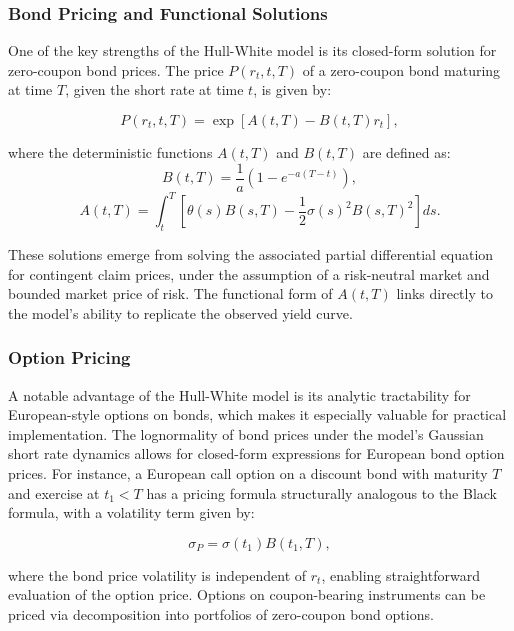 \subsubsection{Bond Pricing and Functional Solutions}
One of the key strengths of the Hull-White model is its closed-form solution for zero-coupon bond prices. The price \( P(r_t, t, T) \) of a zero-coupon bond maturing at time \( T \), given the short rate at time \( t \), is given by:

\begin{equation}
	P(r_t, t, T) = \exp\left[ A(t, T) - B(t, T) r_t \right],
\end{equation}

where the deterministic functions \( A(t, T) \) and \( B(t, T) \) are defined as:
\begin{equation}
	B(t, T) = \frac{1}{a} \left(1 - e^{-a(T - t)}\right),
\end{equation}
\begin{equation}
	A(t, T) = \int_t^T \left[ \theta(s) B(s, T) - \frac{1}{2} \sigma(s)^2 B(s, T)^2 \right] ds.
\end{equation}

These solutions emerge from solving the associated partial differential equation for contingent claim prices, under the assumption of a risk-neutral market and bounded market price of risk. The functional form of \( A(t, T) \) links directly to the model's ability to replicate the observed yield curve.

\subsubsection{Option Pricing}
A notable advantage of the Hull-White model is its analytic tractability for European-style options on bonds, which makes it especially valuable for practical implementation. The lognormality of bond prices under the model’s Gaussian short rate dynamics allows for closed-form expressions for European bond option prices. For instance, a European call option on a discount bond with maturity \( T \) and exercise at \( t_1 < T \) has a pricing formula structurally analogous to the Black formula, with a volatility term given by:

\begin{equation}
	\sigma_P = \sigma(t_1) B(t_1, T),
\end{equation}

where the bond price volatility is independent of \( r_t \), enabling straightforward evaluation of the option price. Options on coupon-bearing instruments can be priced via decomposition into portfolios of zero-coupon bond options.

